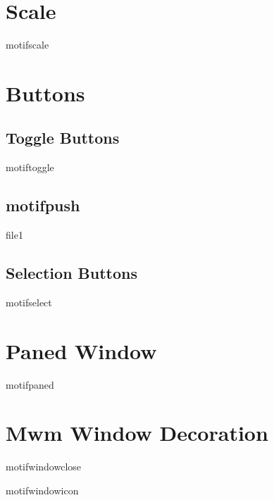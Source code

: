 \section{Scale}

\begin{PAWf}{motifscale}
\end{PAWf}


\section{Buttons}

\subsection{Toggle Buttons}

\begin{PAWf}{motiftoggle}
\end{PAWf}


\subsection{motifpush}

\begin{PAWf}{file1}
\end{PAWf}


\subsection{Selection Buttons}

\begin{PAWf}{motifselect}
\end{PAWf}


\section{Paned Window}

\begin{PAWf}{motifpaned}
\end{PAWf}


\section{Mwm Window Decoration}

\begin{PAWf}{motifwindowclose}
\end{PAWf}

\begin{PAWf}{motifwindowicon}
\end{PAWf}



